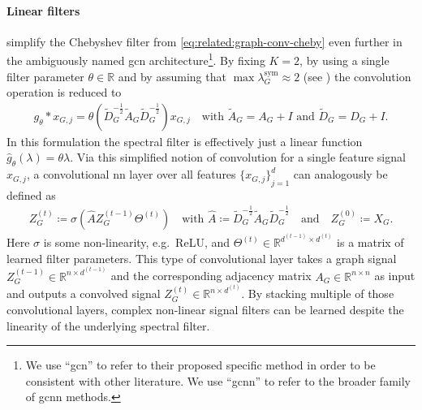 \paragraph{Linear filters}
\citet{Kipf2017} simplify the Chebyshev filter from \cref{eq:related:graph-conv-cheby} even further in the ambiguously named \ac{gcn} architecture\footnote{
	We use ``\acs{gcn}'' to refer to their proposed specific method in order to be consistent with other literature.
	We use ``\acs{gcnn}'' to refer to the broader family of \acl{gcnn} methods.
}.
By fixing $K = 2$, by using a single filter parameter $\theta \in \mathbb{R}$ and by assuming that $\max{\lambda_G^{\text{sym}}} \approx 2$ (see ) the convolution operation is reduced to
\begin{align}
	g_{\theta} * x_{G,j} = \theta \left( \tilde{D}_G^{-\frac{1}{2}} \tilde{A}_G \tilde{D}_G^{-\frac{1}{2}} \right) x_{G,j}
	\quad\text{with $\tilde{A}_G = A_G + I$ and $\tilde{D}_G = D_G + I$.} \label{eq:related:graph-conv-gcn}
\end{align}
In this formulation the spectral filter is effectively just a linear function $\hat{g}_{\theta}(\lambda) = \theta \lambda$.
Via this simplified notion of convolution for a single feature signal $x_{G,j}$, a convolutional \acl{nn} layer over all features ${\{ x_{G,j} \}}_{j=1}^{d}$ can analogously be defined as
\begin{align}
	Z_G^{(t)} \coloneqq \sigma\left( \hat{A} Z_G^{(t-1)} \Theta^{(t)} \right)
	\quad\text{with } \hat{A} \coloneqq \tilde{D}_G^{-\frac{1}{2}} \tilde{A}_G \tilde{D}_G^{-\frac{1}{2}}\quad\text{and}\quad Z_G^{(0)} \coloneqq X_G \text{.} \label{eq:related:gcn-layer}
\end{align}
Here $\sigma$ is some non-linearity, e.g.\ ReLU, and $\Theta^{(t)} \in \mathbb{R}^{d^{(t-1)} \times d^{(t)}}$ is a matrix of learned filter parameters.
This type of convolutional layer takes a graph signal $Z_G^{(t-1)} \in \mathbb{R}^{n \times d^{(t-1)}}$ and the corresponding adjacency matrix $A_G \in \mathbb{R}^{n \times n}$ as input and outputs a convolved signal $Z_G^{(t)} \in \mathbb{R}^{n \times d^{(t)}}$.
By stacking multiple of those convolutional layers, complex non-linear signal filters can be learned despite the linearity of the underlying spectral filter.

